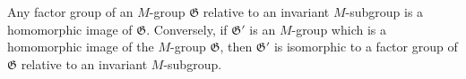 Any factor group of an $M$-group $\mathfrak{G}$ relative to an invariant $M$-subgroup is a homomorphic image of $\mathfrak{G}$. Conversely, if $\mathfrak{G}'$ is an $M$-group which is a homomorphic image of the $M$-group $\mathfrak{G}$, then $\mathfrak{G}'$ is isomorphic to a factor group of $\mathfrak{G}$ relative to an invariant $M$-subgroup.
